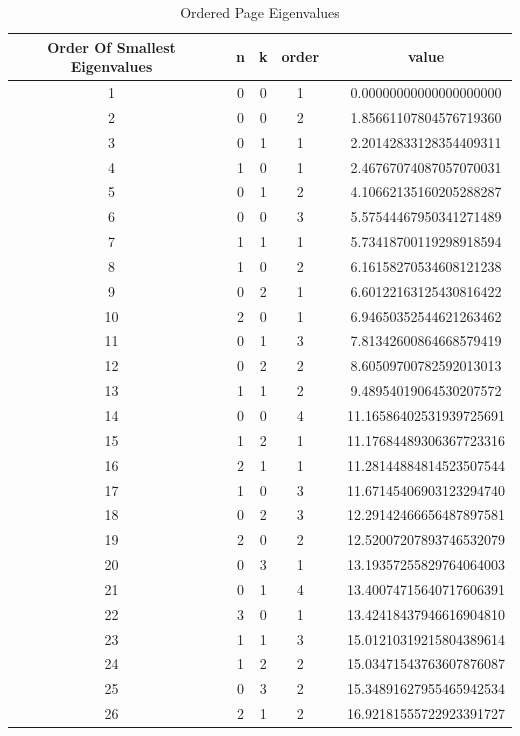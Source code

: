 \documentclass{article}
\begin{document}
\begin{table}[htbp]
\caption{Ordered Page Eigenvalues}
\label{ }
\begin{tabular}{c|c|c|c|c|c|c}
\toprule
Order Of Smallest Eigenvalues &   & n & k & order &   & value \\
\midrule
1 &   & 0 & 0 & 1 &   & 0.00000000000000000000 \\
2 &   & 0 & 0 & 2 &   & 1.85661107804576719360 \\
3 &   & 0 & 1 & 1 &   & 2.20142833128354409311 \\
4 &   & 1 & 0 & 1 &   & 2.46767074087057070031 \\
5 &   & 0 & 1 & 2 &   & 4.10662135160205288287 \\
6 &   & 0 & 0 & 3 &   & 5.57544467950341271489 \\
7 &   & 1 & 1 & 1 &   & 5.73418700119298918594 \\
8 &   & 1 & 0 & 2 &   & 6.16158270534608121238 \\
9 &   & 0 & 2 & 1 &   & 6.60122163125430816422 \\
10 &   & 2 & 0 & 1 &   & 6.94650352544621263462 \\
11 &   & 0 & 1 & 3 &   & 7.81342600864668579419 \\
12 &   & 0 & 2 & 2 &   & 8.60509700782592013013 \\
13 &   & 1 & 1 & 2 &   & 9.48954019064530207572 \\
14 &   & 0 & 0 & 4 &   & 11.16586402531939725691 \\
15 &   & 1 & 2 & 1 &   & 11.17684489306367723316 \\
16 &   & 2 & 1 & 1 &   & 11.28144884814523507544 \\
17 &   & 1 & 0 & 3 &   & 11.67145406903123294740 \\
18 &   & 0 & 2 & 3 &   & 12.29142466656487897581 \\
19 &   & 2 & 0 & 2 &   & 12.52007207893746532079 \\
20 &   & 0 & 3 & 1 &   & 13.19357255829764064003 \\
21 &   & 0 & 1 & 4 &   & 13.40074715640717606391 \\
22 &   & 3 & 0 & 1 &   & 13.42418437946616904810 \\
23 &   & 1 & 1 & 3 &   & 15.01210319215804389614 \\
24 &   & 1 & 2 & 2 &   & 15.03471543763607876087 \\
25 &   & 0 & 3 & 2 &   & 15.34891627955465942534 \\
26 &   & 2 & 1 & 2 &   & 16.92181555722923391727 \\

\end{tabular}
\end{table}
\end{document}
